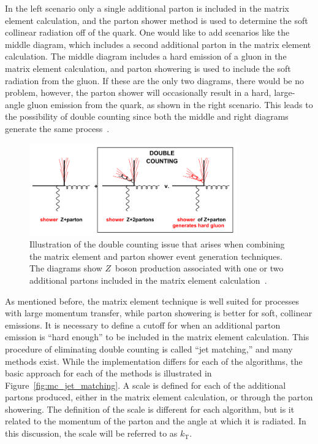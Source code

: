 In the left scenario only a single additional parton is included in the matrix
element calculation, and the parton shower method is used to determine the soft
collinear radiation off of the quark.
One would like to add scenarios like the middle diagram, which includes a
second additional parton in the matrix element calculation.
The middle diagram includes a hard emission of a gluon in the matrix element
calculation, and parton showering is used to include the soft radiation from
the gluon.
If these are the only two diagrams, there would be no problem, however, the
parton shower will occasionally result in a hard, large-angle gluon emission
from the quark, as shown in the right scenario.
This leads to the possibility of double counting since both the middle and
right diagrams generate the same process~\cite{Salam:2010zt}.

\begin{figure}
  \centering
  \includegraphics[width=0.8\textwidth]{figs/mc_gen/double_conting.png}
  \caption[
    Illustration of the double counting issue that arises when combining the
    matrix element and parton shower event generation
    techniques~\cite{Salam:2010zt}.
  ]{
    Illustration of the double counting issue that arises when combining the
    matrix element and parton shower event generation techniques.
    The diagrams show $Z$~boson production associated with one or two
    additional partons included in the matrix element
    calculation~\cite{Salam:2010zt}.
  }
  \label{fig:mc_double_counting}
\end{figure}

As mentioned before, the matrix element technique is well suited for processes
with large momentum transfer, while parton showering is better for soft,
collinear emissions.
It is necessary to define a cutoff for when an additional parton emission is
``hard enough'' to be included in the matrix element calculation.
This procedure of eliminating double counting is called ``jet matching,'' and
many methods exist.
While the implementation differs for each of the algorithms, the basic approach
for each of the methods is illustrated in Figure~\ref{fig:mc_jet_matching}.
A scale is defined for each of the additional partons produced, either in the
matrix element calculation, or through the parton showering.
The definition of the scale is different for each algorithm, but is it related
to the momentum of the parton and the angle at which it is radiated.
In this discussion, the scale will be referred to as $k_\mathrm{T}$.

